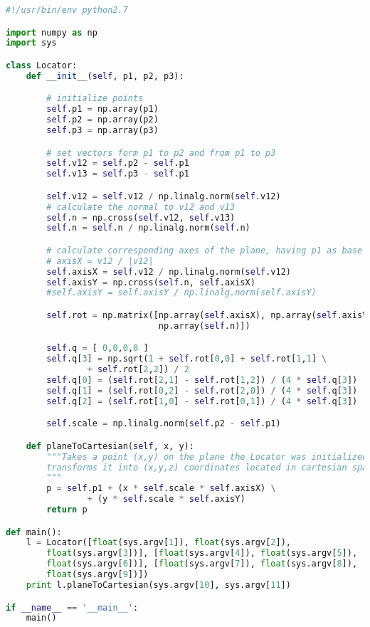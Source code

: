 \documentclass[10pt,a4paper]{scrartcl}
\newcounter{points}
\begin{document}
\begin{lstlisting}[language=Python]
#!/usr/bin/env python2.7

import numpy as np
import sys

class Locator:
    def __init__(self, p1, p2, p3):

        # initialize points
        self.p1 = np.array(p1)
        self.p2 = np.array(p2)
        self.p3 = np.array(p3)

        # set vectors form p1 to p2 and from p1 to p3
        self.v12 = self.p2 - self.p1
        self.v13 = self.p3 - self.p1

        self.v12 = self.v12 / np.linalg.norm(self.v12)
        # calculate the normal to v12 and v13
        self.n = np.cross(self.v12, self.v13)
        self.n = self.n / np.linalg.norm(self.n)

        # calculate corresponding axes of the plane, having p1 as base
        # axisX = v12 / |v12|
        self.axisX = self.v12 / np.linalg.norm(self.v12)
        self.axisY = np.cross(self.n, self.axisX)
        #self.axisY = self.axisY / np.linalg.norm(self.axisY)

        self.rot = np.matrix([np.array(self.axisX), np.array(self.axisY),
                              np.array(self.n)])

        self.q = [ 0,0,0,0 ]
        self.q[3] = np.sqrt(1 + self.rot[0,0] + self.rot[1,1] \
                + self.rot[2,2]) / 2
        self.q[0] = (self.rot[2,1] - self.rot[1,2]) / (4 * self.q[3])
        self.q[1] = (self.rot[0,2] - self.rot[2,0]) / (4 * self.q[3])
        self.q[2] = (self.rot[1,0] - self.rot[0,1]) / (4 * self.q[3])

        self.scale = np.linalg.norm(self.p2 - self.p1)

    def planeToCartesian(self, x, y):
        """Takes a point (x,y) on the plane the Locator was initialized for and
        transforms it into (x,y,z) coordinates located in cartesian space.
        """
        p = self.p1 + (x * self.scale * self.axisX) \
                + (y * self.scale * self.axisY)
        return p

def main():
    l = Locator([float(sys.argv[1]), float(sys.argv[2]),
        float(sys.argv[3])], [float(sys.argv[4]), float(sys.argv[5]),
        float(sys.argv[6])], [float(sys.argv[7]), float(sys.argv[8]),
        float(sys.argv[9])])
    print l.planeToCartesian(sys.argv[10], sys.argv[11])

if __name__ == '__main__':
    main()
\end{lstlisting}
\end{document}
